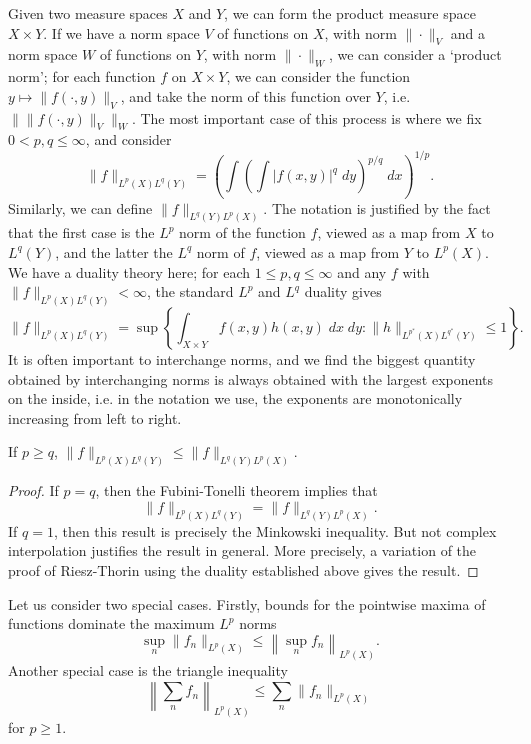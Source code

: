 Given two measure spaces $X$ and $Y$, we can form the product measure space $X \times Y$. If we have a norm space $V$ of functions on $X$, with norm $\| \cdot \|_V$ and a norm space $W$ of functions on $Y$, with norm $\| \cdot \|_W$, we can consider a `product norm'; for each function $f$ on $X \times Y$, we can consider the function $y \mapsto \| f(\cdot,y) \|_V$, and take the norm of this function over $Y$, i.e. $\| \| f(\cdot,y) \|_V \|_W$. The most important case of this process is where we fix $0 < p,q \leq \infty$, and consider
%
\[ \| f \|_{L^p(X) L^q(Y)} = \left( \int \left( \int |f(x,y)|^q \; dy \right)^{p/q}\; dx \right)^{1/p}. \]
%
Similarly, we can define $\| f \|_{L^q(Y) L^p(X)}$. The notation is justified by the fact that the first case is the $L^p$ norm of the function $f$, viewed as a map from $X$ to $L^q(Y)$, and the latter the $L^q$ norm of $f$, viewed as a map from $Y$ to $L^p(X)$. We have a duality theory here; for each $1 \leq p,q \leq \infty$ and any $f$ with $\| f \|_{L^p(X) L^q(Y)} < \infty$, the standard $L^p$ and $L^q$ duality gives
%
\[ \| f \|_{L^p(X) L^q(Y)} = \sup \left\{ \int_{X \times Y} f(x,y) h(x,y)\; dx\;dy : \| h \|_{L^{p^*}(X) L^{q^*}(Y)} \leq 1 \right\}. \]
%
It is often important to interchange norms, and we find the biggest quantity obtained by interchanging norms is always obtained with the largest exponents on the inside, i.e. in the notation we use, the exponents are monotonically increasing from left to right.

\begin{theorem}
    If $p \geq q$, $\| f \|_{L^p(X) L^q(Y)} \leq \| f \|_{L^q(Y) L^p(X)}$.
\end{theorem}
\begin{proof}
  If $p = q$, then the Fubini-Tonelli theorem implies that
  \[ \| f \|_{L^p(X) L^q(Y)} = \| f \|_{L^q(Y) L^p(X)}. \]
  If $q = 1$, then this result is precisely the Minkowski inequality. But not complex interpolation justifies the result in general. More precisely, a variation of the proof of Riesz-Thorin using the duality established above gives the result.
\end{proof}

Let us consider two special cases. Firstly, bounds for the pointwise maxima of functions dominate the maximum $L^p$ norms
%
\[ \sup_n \| f_n \|_{L^p(X)} \leq \left\| \sup_n f_n \right\|_{L^p(X)}. \]
%
Another special case is the triangle inequality
%
\[ \left\| \sum_n f_n \right\|_{L^p(X)} \leq \sum_n \| f_n \|_{L^p(X)} \]
%
for $p \geq 1$.

